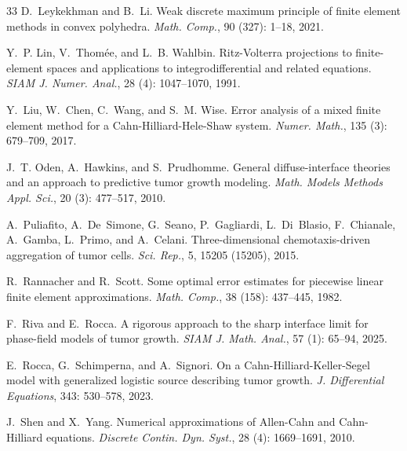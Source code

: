 \documentclass[11pt, reqno]{amsart}
\theoremstyle{definition}
\numberwithin{equation}{section}
\begin{document}
\begin{thebibliography}{33}
	D.~Leykekhman and B.~Li.
	\newblock Weak discrete maximum principle of finite element methods in convex
	polyhedra.
	\newblock \emph{Math. Comp.}, 90 (327): 1--18, 2021.
	
	Y.~P. Lin, V.~Thom\'{e}e, and L.~B. Wahlbin.
	\newblock Ritz-{V}olterra projections to finite-element spaces and applications
	to integrodifferential and related equations.
	\newblock \emph{SIAM J. Numer. Anal.}, 28 (4): 1047--1070,
	1991.
	
	Y.~Liu, W.~Chen, C.~Wang, and S.~M. Wise.
	\newblock Error analysis of a mixed finite element method for a
	{C}ahn-{H}illiard-{H}ele-{S}haw system.
	\newblock \emph{Numer. Math.}, 135 (3): 679--709, 2017.
	
	J.~T. Oden, A.~Hawkins, and S.~Prudhomme.
	\newblock General diffuse-interface theories and an approach to predictive
	tumor growth modeling.
	\newblock \emph{Math. Models Methods Appl. Sci.}, 20 (3):
	477--517, 2010.
	
	A.~Puliafito, A.~De~Simone, G.~Seano, P.~Gagliardi, L.~Di~Blasio, F.~Chianale,
	A.~Gamba, L.~Primo, and A.~Celani.
	\newblock Three-dimensional chemotaxis-driven aggregation of tumor cells.
	\newblock \emph{Sci. Rep.}, 5, 15205 (15205), 2015.
	
	R.~Rannacher and R.~Scott.
	\newblock Some optimal error estimates for piecewise linear finite element
	approximations.
	\newblock \emph{Math. Comp.}, 38 (158): 437--445, 1982.
	
	F.~Riva and E.~Rocca.
	\newblock A rigorous approach to the sharp interface limit for phase-field
	models of tumor growth.
	\newblock \emph{SIAM J. Math. Anal.}, 57 (1): 65--94, 2025.
	
	E.~Rocca, G.~Schimperna, and A.~Signori.
	\newblock On a {C}ahn-{H}illiard-{K}eller-{S}egel model with generalized
	logistic source describing tumor growth.
	\newblock \emph{J. Differential Equations}, 343: 530--578, 2023.
	
	J.~Shen and X.~Yang.
	\newblock Numerical approximations of {A}llen-{C}ahn and {C}ahn-{H}illiard
	equations.
	\newblock \emph{Discrete Contin. Dyn. Syst.}, 28 (4):
	1669--1691, 2010.
	

\end{thebibliography}
\end{document}

